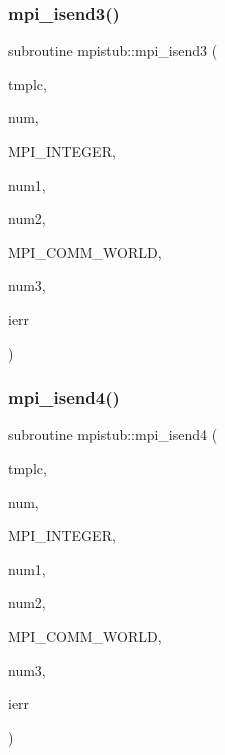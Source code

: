\subsubsection{\texorpdfstring{mpi\_isend3()}{mpi\_isend3()}}
{\footnotesize\ttfamily subroutine mpistub\+::mpi\+\_\+isend3 (\begin{DoxyParamCaption}\item[{integer, dimension(\+:)}]{tmplc,  }\item[{}]{num,  }\item[{}]{M\+P\+I\+\_\+\+I\+N\+T\+E\+G\+ER,  }\item[{}]{num1,  }\item[{}]{num2,  }\item[{}]{M\+P\+I\+\_\+\+C\+O\+M\+M\+\_\+\+W\+O\+R\+LD,  }\item[{}]{num3,  }\item[{}]{ierr }\end{DoxyParamCaption})}

\mbox{\label{namespacempistub_a4afba16e08f9475afade41e36b28333c}} 
\subsubsection{\texorpdfstring{mpi\_isend4()}{mpi\_isend4()}}
{\footnotesize\ttfamily subroutine mpistub\+::mpi\+\_\+isend4 (\begin{DoxyParamCaption}\item[{integer}]{tmplc,  }\item[{}]{num,  }\item[{}]{M\+P\+I\+\_\+\+I\+N\+T\+E\+G\+ER,  }\item[{}]{num1,  }\item[{}]{num2,  }\item[{}]{M\+P\+I\+\_\+\+C\+O\+M\+M\+\_\+\+W\+O\+R\+LD,  }\item[{}]{num3,  }\item[{}]{ierr }\end{DoxyParamCaption})}

\mbox{\label{namespacempistub_a43bcd6e1779da1802197e44427742c2b}} 
